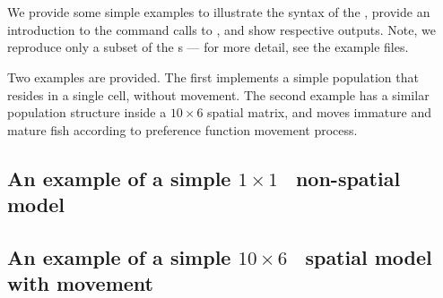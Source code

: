 
\section{\label{sec:examples}}

We provide some simple examples to illustrate the syntax of the \config, provide an introduction to the command calls to \SPM, and show respective outputs. Note, we reproduce only a subset of the \config s --- for more detail, see the example files. 

Two examples are provided. The first implements a simple population that resides in a single cell, without movement. The second example has a similar population structure inside a $10 \times 6$ spatial matrix, and moves immature and mature fish according to preference function movement process.

\subsection{An example of a simple
  \texorpdfstring{$ 1 \times 1 $}{%
    1 x 1
  }%
\ non-spatial model\label{example1}}



\subsection{An example of a simple
  \texorpdfstring{$ 10 \times 6 $}{%
    10 x 6
  }%
\ spatial model with movement\label{example2}}



